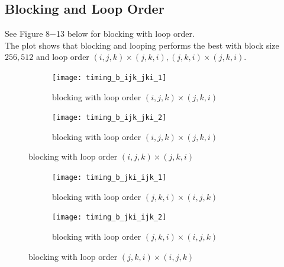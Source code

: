 \documentclass[12pt]{article}
\numberwithin{equation}{section}
\begin{document}
\subsection{Blocking and Loop Order}

See Figure 8$-$13 below for blocking with loop order.
\\
The plot shows that blocking and looping performs the best with block size $256, 512$ and loop order $(i, j, k)\times(j, k, i), (j, k, i)\times(j, k, i)$.

\begin{figure}[!ht]
   \begin{subfigure}
      \centering
        \begin{center}
      \texttt{[image: timing\_b\_ijk\_jki\_1]}
        \end{center}
      \label{aload0}
      \caption{blocking with loop order $(i, j, k)\times(j, k, i)$}
  \end{subfigure}
  \begin{subfigure}
      \centering
        \begin{center}
      \texttt{[image: timing\_b\_ijk\_jki\_2]}
        \end{center}
      \label{aload1}
      \caption{blocking with loop order $(i, j, k)\times(j, k, i)$}
  \end{subfigure}

\end{figure}

\begin{figure}[!ht]
   \begin{subfigure}
      \centering
        \begin{center}
      \texttt{[image: timing\_b\_jki\_ijk\_1]}
        \end{center}
      \label{aload0}
      \caption{blocking with loop order $(j, k, i)\times(i, j, k)$}
  \end{subfigure}
  \begin{subfigure}
      \centering
        \begin{center}
      \texttt{[image: timing\_b\_jki\_ijk\_2]}
        \end{center}
      \label{aload1}
      \caption{blocking with loop order $(j, k, i)\times(i, j, k)$}
  \end{subfigure}

\end{figure}
\end{document}
